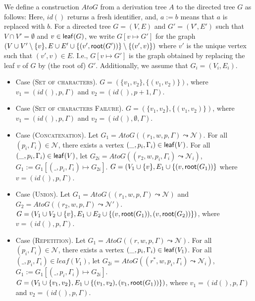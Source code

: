 \documentclass[conference]{IEEEtran}
\newcommand{\togform}{{\mathit AtoG}}
\newcommand{\leaf}{{\sf leaf}}
\newcommand{\groot}{{\sf root}}
\newcommand{\fresh}{\mathit{id}}
\begin{document}
We define a construction $\togform{}$ from a derivation tree $A$ to the directed tree $G$ as follows: 
Here, $\fresh{}()$ returns a fresh identifier, and, $a := b$ means that $a$ is replaced with $b$.  For a directed tree $G = (V,E)$ and $G' = (V',E')$ such that $V \cap V' = \emptyset$ and $v \in \leaf(G)$, we write $G[v \mapsto G']$ for the graph $(V \cup V'\setminus \{v\}, E \cup E' \cup \{(v',\groot(G'))\} \setminus \{ (v',v) \})$ where $v'$ is the unique vertex such that $(v',v) \in E$.  I.e., $G[v \mapsto G']$ is the graph obtained by replacing the leaf $v$ of $G$ by (the root of) $G'$.
Additionally, we assume that $G_i = (V_i, E_i)$.
\begin{itemize}
    \item Case (\textsc{Set of characters}). $G = (\{v_1, v_2\},\{ (v_1,v_2) \})$, where $v_1 = (\fresh(), p, \Gamma)$ and $v_2 = (\fresh(), p+1, \Gamma)$.
    \item Case (\textsc{Set of characters Failure}). $G = (\{v_1, v_2\},\{ (v_1,v_2) \})$, where $v_1 = (\fresh(), p, \Gamma)$ and $v_2 = (\fresh(), \emptyset{}, \Gamma)$.    
    \item Case (\textsc{Concatenation}). Let $G_1 = \togform{}((r_1, w, p, \Gamma) \leadsto{} \mathcal{N})$. For all $(p_i, \Gamma_i) \in \mathcal{N}$, there exists a vertex $(\_, p_i, \Gamma_i) \in \leaf{}(V)$.
    For all $(\_, p_i, \Gamma_i) \in \leaf{}(V)$, let $G_{2i} = \togform{}((r_2,w,p_i,\Gamma_i) \leadsto{} \mathcal{N}_i)$, $G_1 := G_1[(\_, p_i, \Gamma_i) \mapsto{} G_{2i}]$.   $G = (V_1 \cup \{ v \}, E_1 \cup \{ (v,\groot(G_1)) \}$ where $v = (\fresh(),p,\Gamma)$.
    
    \item Case (\textsc{Union}). Let $G_1 = \togform{}((r_1, w, p, \Gamma) \leadsto{} \mathcal{N})$ and $G_2 = \togform{}((r_2, w, p, \Gamma) \leadsto{} \mathcal{N'})$. $G = ( V_1 \cup V_2 \cup \{ v \}, E_1 \cup E_2 \cup \{ (v, \groot{}(G_1)), (v, \groot{}(G_2)) \} )$, where $v = (\fresh(), p, \Gamma)$.
    
    \item Case (\textsc{Repetition}). 
    Let $G_1 = \togform{}((r,w,p,\Gamma)\leadsto{}\mathcal{N})$.
    For all $(p_i, \Gamma_i) \in \mathcal{N}$, there exists a vertex $(\_, p_i, \Gamma_i) \in \leaf{}(V_1)$.
    For all $(\_, p_i, \Gamma_i) \in leaf{}(V_1)$, let $G_{2i} = \togform{}((r^*,w,p_i,\Gamma_i)\leadsto{}\mathcal{N}_i)$, $G_1 := G_1[(\_, p_i, \Gamma_i) \mapsto{} G_{2i}]$.
    $G = (V_1 \cup \{ v_1, v_2 \}, E_1 \cup \{ (v_1,v_2), (v_1,\groot{}(G_1)) \} )$, where $v_1 = (\fresh(), p, \Gamma)$ and $v_2 = (\fresh(), p, \Gamma)$.
    

\end{itemize}
\end{document}
